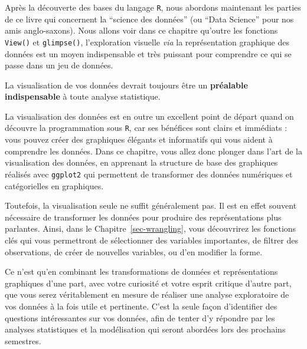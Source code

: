 \documentclass[
  a4paper,
  DIV=11,
  numbers=noendperiod,
  oneside]{scrreprt}
\begin{document}
Après la découverte des bases du langage \texttt{R}, nous abordons
maintenant les parties de ce livre qui concernent la ``science des
données'' (ou ``Data Science'' pour nos amis anglo-saxons). Nous allons
voir dans ce chapitre qu'outre les fonctions \texttt{View()} et
\texttt{glimpse()}, l'exploration visuelle \emph{via} la représentation
graphique des données est un moyen indispensable et très puissant pour
comprendre ce qui se passe dans un jeu de données.

\begin{tcolorbox}[enhanced jigsaw, coltitle=black, toprule=.15mm, opacityback=0, breakable, colback=white, opacitybacktitle=0.6, colframe=quarto-callout-important-color-frame, leftrule=.75mm, rightrule=.15mm, titlerule=0mm, bottomtitle=1mm, toptitle=1mm, arc=.35mm, title=\textcolor{quarto-callout-important-color}{\faExclamation}\hspace{0.5em}{Important}, colbacktitle=quarto-callout-important-color!10!white, bottomrule=.15mm, left=2mm]

La visualisation de vos données devrait toujours être un
\textbf{préalable indispensable} à toute analyse statistique.

\end{tcolorbox}

La visualisation des données est en outre un excellent point de départ
quand on découvre la programmation sous \texttt{R}, car ses bénéfices
sont clairs et immédiats : vous pouvez créer des graphiques élégants et
informatifs qui vous aident à comprendre les données. Dans ce chapitre,
vous allez donc plonger dans l'art de la visualisation des données, en
apprenant la structure de base des graphiques réalisés avec
\texttt{ggplot2} qui permettent de transformer des données numériques et
catégorielles en graphiques.

Toutefois, la visualisation seule ne suffit généralement pas. Il est en
effet souvent nécessaire de transformer les données pour produire des
représentations plus parlantes. Ainsi, dans le
Chapitre~\ref{sec-wrangling}, vous découvrirez les fonctions clés qui
vous permettront de sélectionner des variables importantes, de filtrer
des observations, de créer de nouvelles variables, ou d'en modifier la
forme.

Ce n'est qu'en combinant les transformations de données et
représentations graphiques d'une part, avec votre curiosité et votre
esprit critique d'autre part, que vous serez véritablement en mesure de
réaliser une analyse exploratoire de vos données à la fois utile et
pertinente. C'est la seule façon d'identifier des questions
intéressantes sur vos données, afin de tenter d'y répondre par les
analyses statistiques et la modélisation qui seront abordées lors des
prochains semestres.
\end{document}
